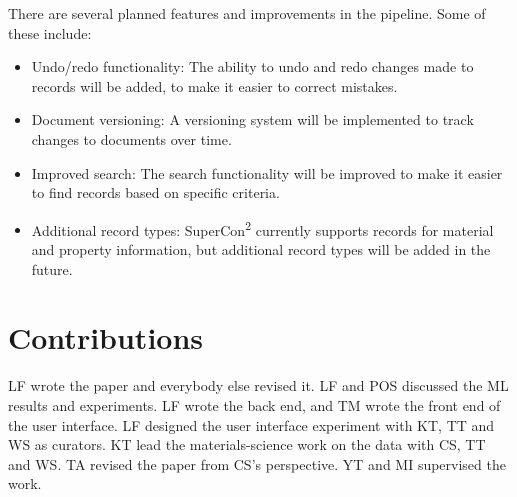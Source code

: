 \documentclass[a4paper]{article}
\begin{document}
There are several planned features and improvements in the pipeline. Some of these include:

\begin{itemize}
    \item Undo/redo functionality: The ability to undo and redo changes made to records will be added, to make it easier to correct mistakes.
    \item Document versioning: A versioning system will be implemented to track changes to documents over time.
    \item Improved search: The search functionality will be improved to make it easier to find records based on specific criteria.
    \item Additional record types: SuperCon\textsuperscript{2} currently supports records for material and property information, but additional record types will be added in the future.
\end{itemize}

\section*{Contributions}
LF wrote the paper and everybody else revised it. 
LF and POS discussed the ML results and experiments. 
LF wrote the back end, and TM wrote the front end of the user interface. 
LF designed the user interface experiment with KT, TT and WS as curators.
KT lead the materials-science work on the data with CS, TT and WS.
TA revised the paper from CS's perspective.
YT and MI supervised the work. 




\end{document}
